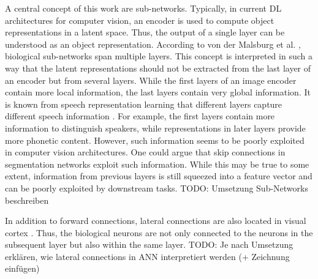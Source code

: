 A central concept of this work are sub-networks.
Typically, in current DL architectures for computer vision, an encoder is used to compute object representations in a latent space.
Thus, the output of a single layer can be understood as an object representation.
According to von der Malsburg et al. \cite{von_der_Malsburg_Stadelmann_Grewe_2022}, biological sub-networks span multiple layers.
This concept is interpreted in such a way that the latent representations should not be extracted from the last layer of an encoder but from several layers.
While the first layers of an image encoder contain more local information, the last layers contain very global information.
It is known from speech representation learning that different layers capture different speech information .
For example, the first layers contain more information to distinguish speakers, while representations in later layers provide more phonetic content.
However, such information seems to be poorly exploited in computer vision architectures.
One could argue that skip connections in segmentation networks  exploit such information.
While this may be true to some extent, information from previous layers is still squeezed into a feature vector and can be poorly exploited by downstream tasks.
TODO: Umsetzung Sub-Networks beschreiben

In addition to forward connections, lateral connections are also located in visual cortex .
Thus, the biological neurons are not only connected to the neurons in the subsequent layer but also within the same layer.
TODO: Je nach Umsetzung erklären, wie lateral connections in ANN interpretiert werden (+ Zeichnung einfügen)

